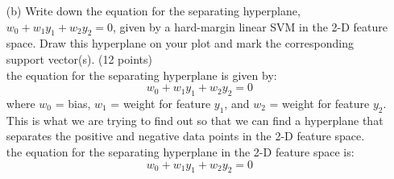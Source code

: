 \documentclass[a3paper,12pt]{article} %
\begin{document}
\begin{enumerate}
    \item[(b)] Write down the equation for the separating hyperplane, 
    \(
    w_0 + w_1y_1 + w_2y_2 = 0
    \),
    given by a hard-margin linear SVM in the 2-D feature space. Draw this hyperplane on your plot and mark the corresponding support vector(s). \hfill (12 points)
    \\ the equation for the separating hyperplane is given by:
    \[
    w_0 + w_1y_1 + w_2y_2 = 0
    \]
    where \(w_0\) = bias, \(w_1\) = weight for feature \(y_1\), and \(w_2\) = weight for feature \(y_2\). This is what we are trying to find out so that we can find a hyperplane that separates the positive and negative data points in the 2-D feature space.
    \\ the equation for the separating hyperplane in the 2-D feature space is:
    \[
    w_0 + w_1y_1 + w_2y_2 = 0
    \]

\end{enumerate}
\end{document}
